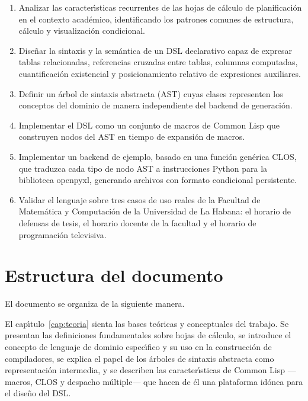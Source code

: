 \begin{enumerate}
  \item Analizar las caracter\'{\i}sticas recurrentes de las hojas de c\'alculo
    de planificaci\'on en el contexto acad\'emico, identificando los patrones
    comunes de estructura, c\'alculo y visualizaci\'on condicional.

  \item Dise\~nar la sintaxis y la sem\'antica de un DSL declarativo capaz de
    expresar tablas relacionadas, referencias cruzadas entre tablas,
    columnas computadas, cuantificaci\'on existencial y posicionamiento
    relativo de expresiones auxiliares.

  \item Definir un \'arbol de sintaxis abstracta (AST) cuyas clases
    representen los conceptos del dominio de manera independiente del
    backend de generaci\'on.

  \item Implementar el DSL como un conjunto de macros de Common Lisp que
    construyen nodos del AST en tiempo de expansi\'on de macros.

  \item Implementar un backend de ejemplo, basado en una funci\'on gen\'erica
    CLOS, que traduzca cada tipo de nodo AST a instrucciones Python para la
    biblioteca openpyxl, generando archivos \xlsx{} con formato condicional
    persistente.

  \item Validar el lenguaje sobre tres casos de uso reales de la Facultad
    de Matem\'atica y Computaci\'on de la Universidad de La Habana: el
    horario de defensas de tesis, el horario docente de la facultad y
    el horario de programaci\'on televisiva.
\end{enumerate}

\section*{Estructura del documento}

El documento se organiza de la siguiente manera.

El cap\'{\i}tulo~\ref{cap:teoria} sienta las bases te\'oricas y conceptuales del
trabajo.  Se presentan las definiciones fundamentales sobre hojas de c\'alculo,
se introduce el concepto de lenguaje de dominio espec\'{\i}fico y su uso en la
construcci\'on de compiladores, se explica el papel de los \'arboles de sintaxis
abstracta como representaci\'on intermedia, y se describen las caracter\'{\i}sticas
de Common Lisp ---macros, CLOS y despacho m\'ultiple--- que hacen de \'el una
plataforma id\'onea para el dise\~no del DSL.

